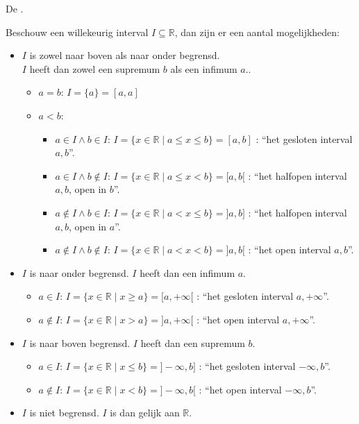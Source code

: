 \documentclass[main.tex]{subfiles}
\begin{document}
\begin{st}
  De .

  Beschouw een willekeurig interval $I \subseteq \mathbb{R}$, dan zijn er een aantal mogelijkheden:
  \begin{itemize}
  \item $I$ is zowel naar boven als naar onder begrensd.\\
    $I$ heeft dan zowel een supremum $b$ als een infimum $a$..
    \begin{itemize}
    \item $a=b$: $I=\{a\} = [a,a]$
    \item $a<b$: 
      \begin{itemize}
      \item $a\in I \wedge b\in I$: $I = \{ x\in \mathbb{R} \mid a\le x \le b\} = [a,b]$ : ``het gesloten interval $a,b$''.
      \item $a\in I \wedge b\not\in I$: $I = \{ x\in \mathbb{R} \mid a\le x < b\} = [a,b[$ : ``het halfopen interval $a,b$, open in $b$''.
      \item $a\not\in I \wedge b\in I$: $I = \{ x\in \mathbb{R} \mid a< x \le b\} = ]a,b]$ : ``het halfopen interval $a,b$, open in $a$''.
      \item $a\not\in I \wedge b\not\in I$: $I = \{ x\in \mathbb{R} \mid a< x < b\} = ]a,b[$ : ``het open interval $a,b$''.
      \end{itemize}
    \end{itemize}
  \item $I$ is naar onder begrensd.
    $I$ heeft dan een infimum $a$.
    \begin{itemize}
    \item $a\in I$: $I = \{ x\in \mathbb{R} \mid x \ge a\} = [a,+\infty[$ : ``het gesloten interval $a, +\infty$''.
    \item $a\not\in I$: $I = \{ x\in \mathbb{R} \mid x > a\} = ]a,+\infty[$ : ``het open interval $a, +\infty$''.
    \end{itemize}
  \item $I$ is naar boven begrensd.
    $I$ heeft dan een supremum $b$.
    \begin{itemize}
    \item $a\in I$: $I = \{ x\in \mathbb{R} \mid x \le b \} = ]-\infty,b]$ : ``het gesloten interval $-\infty, b$''.
    \item $a\not\in I$: $I = \{ x\in \mathbb{R} \mid x < b \} = ]-\infty,b[$ : ``het open interval $-\infty,b$''. 
    \end{itemize}
  \item $I$ is niet begrensd. $I$ is dan gelijk aan $\mathbb{R}$.
  \end{itemize}
\zb
\end{st}
\end{document}
